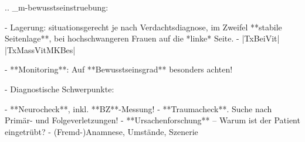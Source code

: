 \label{proc:MR40001B}

.. _m-bewusstseinstruebung:


\begin{itemize}
  -   Lagerung: situationsgerecht je nach
  Verdachtsdiagnose, im Zweifel **stabile
  Seitenlage**, bei hochschwangeren Frauen auf die
  *linke* Seite.
  -   |TxBeiVit| |TxMassVitMKBes|
  
  \begin{itemize}
    -   **Monitoring**: Auf **Bewusstseinsgrad**
    besonders achten!
  \end{itemize}
  
  
  -   Diagnostische Schwerpunkte:
  \begin{itemize}
    -   **Neurocheck**, inkl. **BZ**-Messung!
    -   **Traumacheck**. Suche nach Primär- und
    Folgeverletzungen!
    -   **Ursachenforschung** -- Warum ist der
    Patient eingetrübt?
    -   (Fremd-)Anamnese, Umstände, Szenerie
  \end{itemize}
\end{itemize}
